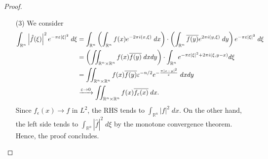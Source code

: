 \documentclass{article}
\numberwithin{equation}{section}
\begin{document}
\begin{proof}
\begin{enumerate}[itemsep =-2pt,label = (\arabic{*})]
			Since the integrand tends to 0 a.e. as $\epsilon \to 0$, and is dominated by a suitable $L^{1}$ function, we conclude that $\beta_{\epsilon} \to \beta$ under the $L^{p}$ norm as $\epsilon \to 0$.
			We shall now conclude the proof of the Fourier Inversion Formula as follows: 
			\begin{align*}
				\begin{split}
					(\wh{f})^{\check{}} &= \lim_{\epsilon \to 0}\int_{\mathbb{R}^{n}}g(\xi)\wh{f}(\xi)\;d\xi \\
					&= \lim_{\epsilon\to 0}\int_{\mathbb{R}^{n}}f(y)\wh{g}(y)\;dy\\
					&= \lim_{\epsilon \to 0}\int_{\mathbb{R}^{n}}f(y)\epsilon^{-n}e^{-\frac{\pi |x - y|^{2}}{\epsilon^{2}}}\;dy \\
					&\xrightarrow[\text{in $L^{p}$}]{\epsilon \to 0} f(x). 
				\end{split}
			\end{align*}
			Thus, $(\wh{f})^{\check{}} = f(x)$ a.e.  
			\item[(3)] We consider 
			\begin{align}
				\begin{split}
					\int_{\mathbb{R}^{n}}\left| \hat{f}(\xi) \right|^{2}e^{-\pi \varepsilon |\xi|^{2}}\;d\xi &= \int_{\mathbb{R}^{n}}\left(\int_{\mathbb{R}^{n}}f(x)e^{-2\pi i (x, \xi)}\;dx\right) \cdot \left(\int_{\mathbb{R}^{n}}\overline{f(y)}e^{2\pi i (y, \xi)}\;dy\right)e^{-\pi \varepsilon |\xi|^{2}}\;d\xi \\
					&= \left(\iint_{\mathbb{R}^{n}\times \mathbb{R}^{n}}f(x)\overline{f(y)}\;dx dy\right) \cdot \int_{\mathbb{R}^{n}}e^{-\pi \varepsilon |\xi|^{2} + 2\pi i (\xi, y - x)}d\xi \\
					&= \iint_{\mathbb{R}^{n} \times \mathbb{R}^{n}}f(x)\overline{f(y)}\varepsilon^{-n/2}e^{-\frac{\pi|x - y|^{2}}{\varepsilon}}\;dx dy \\
					&\xrightarrow{\varepsilon \to 0} \iint_{\mathbb{R}^{n} \times \mathbb{R}^{n}}f(x)\overline{f_{\varepsilon}(x)}\;dx. 
				\end{split}
			\end{align}
			Since $f_{\epsilon}(x) \to f$ in $L^{2}$, the RHS tends to $\int_{\mathbb{R}^{n}}|f|^{2}\;dx$. On the other hand, the left side tends to $\int_{\mathbb{R}^{n}}|\hat{f}|^{2}\;d\xi$ by the monotone convergence theorem. Hence, the proof concludes. 
		\end{enumerate}
	\end{proof}
\end{document}
